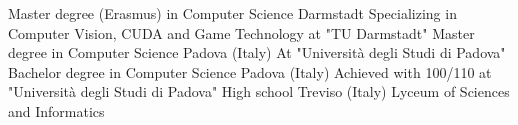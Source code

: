 \documentclass[letterpaper]{twentysecondcv} %
\begin{document}
\begin{twenty} %
		{Master degree (Erasmus) in Computer Science}	{Darmstadt}
		{Specializing in Computer Vision, CUDA and Game Technology at "TU Darmstadt"\footnotemark[1]}
		{Master degree in Computer Science}	{Padova (Italy)}
		{At "Università degli Studi di Padova"\footnotemark[2]}
		{Bachelor degree in Computer Science}	{Padova (Italy)}
		{Achieved with 100/110 at "Università degli Studi di Padova"\footnotemark[2]}
		{High school}	{Treviso (Italy)}
		{Lyceum of Sciences and Informatics}
\end{twenty}








\end{document}
